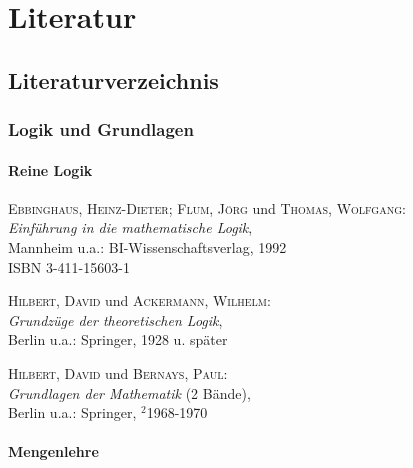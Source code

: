 \part{Literatur}

\chapter{Literaturverzeichnis}

\section{Logik und Grundlagen}

\subsection{Reine Logik}

\begin{description}
  
\item \textsc{Ebbinghaus, Heinz-Dieter; Flum, J\"org} und
  \textsc{Thomas, Wolfgang}: \\
  \textit{Einf\"uhrung in die mathematische Logik}, \\
  Mannheim u.a.: BI-Wissenschaftsverlag, 1992 \\
  ISBN 3-411-15603-1
  

\item \textsc{Hilbert, David} und \textsc{Ackermann, Wilhelm}: \\
  \textit{Grundz\"uge der theoretischen Logik}, \\
  Berlin u.a.: Springer, 1928 u. sp\"ater
  

\item \textsc{Hilbert, David} und \textsc{Bernays, Paul}: \\
  \textit{Grundlagen der Mathematik} (2 B\"ande), \\
  Berlin u.a.: Springer, $^2$1968-1970

\end{description}

\subsection{Mengenlehre}


